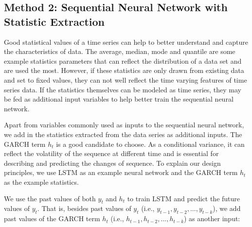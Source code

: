 \subsection{Method 2: Sequential Neural Network with Statistic Extraction}
 Good statistical values of a time series can help to better understand and capture the characteristics  of data. The average, median, mode and quantile are some example statistics parameters that can reflect the distribution of a data set and are used the most. 
 However, if these statistics are only drawn from existing data and set to fixed values, they can not well reflect the time varying features of time series data. If the statistics themselves can be modeled as  time series,  they may be fed as additional input variables to help better train the sequential neural network.
 
 Apart from variables commonly used as inputs to the sequential neural network, we add in the statistics extracted from the data series as additional inputs. The GARCH term $h_t$ is a good candidate to choose. As a conditional variance, it can reflect the volatility of the sequence at different time and is essential for describing and predicting the changes of sequence. To explain our design principles, we use LSTM as an example neural network and the GARCH term $h_t$ as the example statistics. 


  We use the past values of both $y_t$ and $h_t$ to train LSTM and predict the future values of $y_t$.  That is, besides past values of $y_t$ (i.e., ${y_{t-1}, y_{t-2},...,y_{t-k}}$), we add past values of the GARCH term $h_t$ (i.e., ${h_{t-1}, h_{t-2},...,h_{t-k}}$) as another input: %
 
